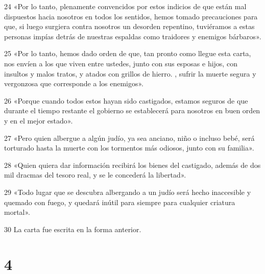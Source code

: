 \par 24 «Por lo tanto, plenamente convencidos por estos indicios de que están mal dispuestos hacia nosotros en todos los sentidos, hemos tomado precauciones para que, si luego surgiera contra nosotros un desorden repentino, tuviéramos a estas personas impías detrás de nuestras espaldas como traidores y enemigos bárbaros».
\par 25 «Por lo tanto, hemos dado orden de que, tan pronto como llegue esta carta, nos envíen a los que viven entre ustedes, junto con sus esposas e hijos, con insultos y malos tratos, y atados con grillos de hierro. , sufrir la muerte segura y vergonzosa que corresponde a los enemigos».
\par 26 «Porque cuando todos estos hayan sido castigados, estamos seguros de que durante el tiempo restante el gobierno se establecerá para nosotros en buen orden y en el mejor estado».
\par 27 «Pero quien albergue a algún judío, ya sea anciano, niño o incluso bebé, será torturado hasta la muerte con los tormentos más odiosos, junto con su familia».
\par 28 «Quien quiera dar información recibirá los bienes del castigado, además de dos mil dracmas del tesoro real, y se le concederá la libertad».
\par 29 «Todo lugar que se descubra albergando a un judío será hecho inaccesible y quemado con fuego, y quedará inútil para siempre para cualquier criatura mortal».
\par 30 La carta fue escrita en la forma anterior.

\chapter{4}

